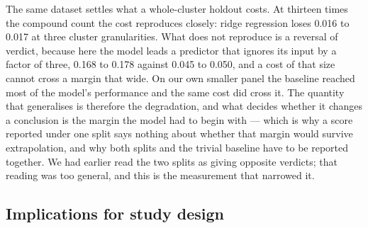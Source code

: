 \documentclass[11pt,a4paper]{article}
\begin{document}
The same dataset settles what a whole-cluster holdout costs. At thirteen
times the compound count the cost reproduces closely: ridge regression
loses 0.016 to 0.017 at three cluster granularities. What does not
reproduce is a reversal of verdict, because here the model leads a
predictor that ignores its input by a factor of three, 0.168 to 0.178
against 0.045 to 0.050, and a cost of that size cannot cross a margin
that wide. On our own smaller panel the baseline reached most of the
model's performance and the same cost did cross it. The quantity that
generalises is therefore the degradation, and what decides whether it
changes a conclusion is the margin the model had to begin with --- which
is why a score reported under one split says nothing about whether that
margin would survive extrapolation, and why both splits and the trivial
baseline have to be reported together. We had earlier read the two
splits as giving opposite verdicts; that reading was too general, and
this is the measurement that narrowed it.

\subsection{Implications for study
design}\label{implications-for-study-design}
\end{document}

